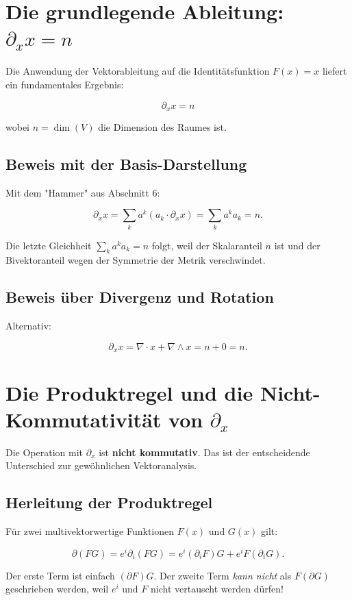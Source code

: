 \documentclass[11pt]{article}
\begin{document}
\section{Die grundlegende Ableitung: \(\partial_x x = n\)}

Die Anwendung der Vektorableitung auf die Identitätsfunktion \(F(x) = x\) liefert ein fundamentales Ergebnis:

\[
\boxed{
\partial_x x = n
}
\]

wobei \(n = \dim(V)\) die Dimension des Raumes ist.

\subsection{Beweis mit der Basis-Darstellung}

Mit dem "Hammer" aus Abschnitt 6:

\[
\partial_x x = \sum_k a^k (a_k \cdot \partial_x x) = \sum_k a^k a_k = n.
\]

Die letzte Gleichheit \(\sum_k a^k a_k = n\) folgt, weil der Skalaranteil \(n\) ist und der Bivektoranteil wegen der Symmetrie der Metrik verschwindet.

\subsection{Beweis über Divergenz und Rotation}

Alternativ:

\[
\partial_x x = \nabla \cdot x + \nabla \wedge x = n + 0 = n.
\]

\section{Die Produktregel und die Nicht-Kommutativität von \(\partial_x\)}

Die Operation mit \(\partial_x\) ist \textbf{nicht kommutativ}. Das ist der entscheidende Unterschied zur gewöhnlichen Vektoranalysis.

\subsection{Herleitung der Produktregel}

Für zwei multivektorwertige Funktionen \(F(x)\) und \(G(x)\) gilt:

\[
\partial (FG) = e^i \partial_i (FG) = e^i (\partial_i F)G + e^i F(\partial_i G).
\]

Der erste Term ist einfach \((\partial F)G\). Der zweite Term \emph{kann nicht} als \(F(\partial G)\) geschrieben werden, weil \(e^i\) und \(F\) nicht vertauscht werden dürfen!
\end{document}
